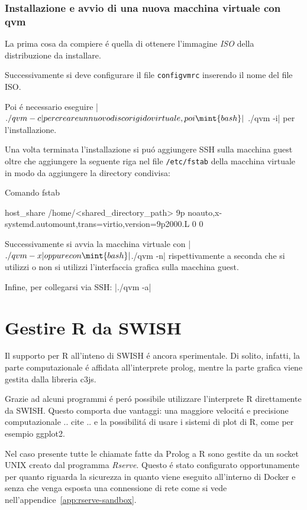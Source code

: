 \documentclass[10pt,titlepage,twoside,a4paper]{report}
\newenvironment{code}{\singlespacing\captionsetup{type=listing}}{}
\begin{document}
\subsection{Installazione e avvio di una nuova macchina virtuale con qvm}
La prima cosa da compiere \'e quella di ottenere l'immagine \emph{ISO} della 
distribuzione da installare.

Successivamente si deve configurare il file \texttt{configvmrc} inserendo il 
nome del file ISO.

Poi \'e necessario eseguire |$ ./qvm -c| per creare un nuovo 
disco rigido virtuale, poi \mint{bash}|$ ./qvm -i| per l'installazione.

Una volta terminata l'installazione si pu\'o aggiungere SSH sulla macchina 
guest oltre che aggiungere la seguente riga nel file \texttt{/etc/fstab} della 
macchina virtuale in modo da aggiungere la directory condivisa:

\begin{code}
    \caption{Comando fstab}
    \begin{textcode*}{}
host_share /home/<shared_directory_path> 9p noauto,x-systemd.automount,trans=virtio,version=9p2000.L 0 0
    \end{textcode*}
\end{code}

Successivamente si avvia la macchina virtuale con |$ ./qvm -x| 
oppure con \mint{bash}|$./qvm -n| rispettivamente a seconda che si utilizzi o 
non si utilizzi l'interfaccia grafica sulla macchina guest.

Infine, per collegarsi via SSH: |./qvm -a|

\chapter{Gestire R da SWISH}
Il supporto per R all'inteno di SWISH \'e ancora sperimentale. Di solito, 
infatti, la parte computazionale \'e affidata all'interprete prolog, mentre la 
parte grafica viene gestita dalla libreria c3js.

Grazie ad alcuni programmi \'e per\'o possibile utilizzare l'interprete R 
direttamente da SWISH. Questo comporta due vantaggi: una maggiore velocit\'a e 
precisione computazionale .. cite .. e la possibilit\'a di usare i sistemi di 
plot di R, come per esempio ggplot2.

Nel caso presente tutte le chiamate fatte da Prolog a R sono gestite da un 
socket UNIX creato dal programma \emph{Rserve}\cite{rserve}. Questo \'e stato 
configurato opportunamente per quanto riguarda la sicurezza in quanto viene 
eseguito all'interno di Docker e senza che venga esposta una connessione di 
rete come si vede nell'appendice~\ref{app:rserve-sandbox}.
\end{document}
